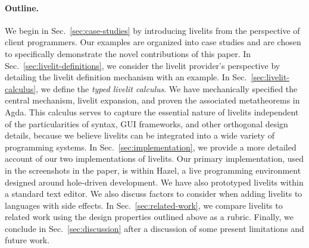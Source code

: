 \paragraph{Outline.} We begin in Sec.~\ref{sec:case-studies} by introducing
livelits from the perspective of client programmers. 
Our examples are organized into case studies 
and are chosen to specifically demonstrate the novel contributions of this paper.
In Sec.~\ref{sec:livelit-definitions}, 
we consider the livelit provider's perspective by detailing the livelit
definition mechanism with an example.
In Sec.~\ref{sec:livelit-calculus}, we define the \emph{typed livelit calculus}. 
We have mechanically specified the central mechanism, livelit expansion, and proven the associated metatheorems in Agda.
This calculus 
serves to capture the essential nature of livelits 
independent of the particularities of syntax, GUI frameworks, 
and other orthogonal design details,
because we believe livelits can be integrated into a wide variety of programming systems. 
In Sec.~\ref{sec:implementation}, we provide a more detailed account of our two implementations of livelits.
Our primary implementation, used in the screenshots in the paper,
is within Hazel, a live programming environment designed 
around hole-driven development. 
We have also prototyped livelits within a standard text editor. 
We also discuss factors to consider when adding livelits to languages with side effects.
In Sec.~\ref{sec:related-work}, we compare livelits to related work using the design properties outlined above 
as a rubric.
Finally, we conclude in Sec.~\ref{sec:discussion} after a discussion of some present limitations and future work.